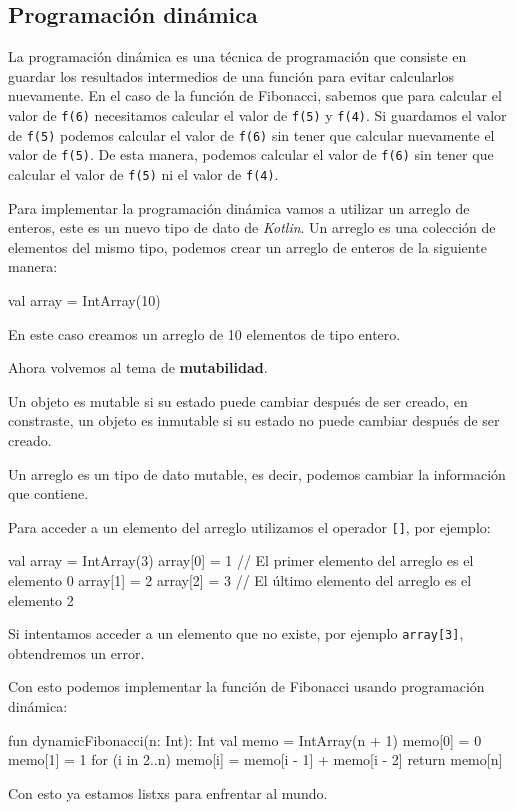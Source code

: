 \subsection{Programación dinámica}
  La programación dinámica es una técnica de programación que consiste en guardar los resultados
  intermedios de una función para evitar calcularlos nuevamente.
  En el caso de la función de Fibonacci, sabemos que para
  calcular el valor de \texttt{f(6)} necesitamos calcular el valor de \texttt{f(5)} y \texttt{f(4)}.
  Si guardamos el valor de \texttt{f(5)} podemos calcular el valor de \texttt{f(6)} sin tener que
  calcular nuevamente el valor de \texttt{f(5)}.
  De esta manera, podemos calcular el valor de \texttt{f(6)} sin tener que calcular el valor de
  \texttt{f(5)} ni el valor de \texttt{f(4)}.
  
  Para implementar la programación dinámica vamos a utilizar un arreglo de enteros, este es un nuevo
  tipo de dato de \textit{Kotlin}.
  Un arreglo es una colección de elementos del mismo tipo, podemos crear un arreglo de enteros de la
  siguiente manera:
  
  \begin{kotlin}
    val array = IntArray(10)
  \end{kotlin}

  En este caso creamos un arreglo de 10 elementos de tipo entero.

  Ahora volvemos al tema de \textbf{mutabilidad}.

  \begin{defaultbox}[mutabilidad]
    Un objeto es mutable si su estado puede cambiar después de ser creado, en constraste, un objeto 
    es inmutable si su estado no puede cambiar después de ser creado.
  \end{defaultbox}

  Un arreglo es un tipo de dato mutable, es decir, podemos cambiar la información que contiene.

  Para acceder a un elemento del arreglo utilizamos el operador \texttt{[]}, por ejemplo:

  \begin{kotlin}
    val array = IntArray(3)
    array[0] = 1  // El primer elemento del arreglo es el elemento 0
    array[1] = 2
    array[2] = 3  // El último elemento del arreglo es el elemento 2
  \end{kotlin}

  Si intentamos acceder a un elemento que no existe, por ejemplo \texttt{array[3]}, obtendremos un
  error.

  Con esto podemos implementar la función de Fibonacci usando programación dinámica:

  \begin{kotlin}
    fun dynamicFibonacci(n: Int): Int {
      val memo = IntArray(n + 1)
      memo[0] = 0
      memo[1] = 1
      for (i in 2..n) {
        memo[i] = memo[i - 1] + memo[i - 2]
      }
      return memo[n]
    }
  \end{kotlin}

  Con esto ya estamos listxs para enfrentar al mundo.
